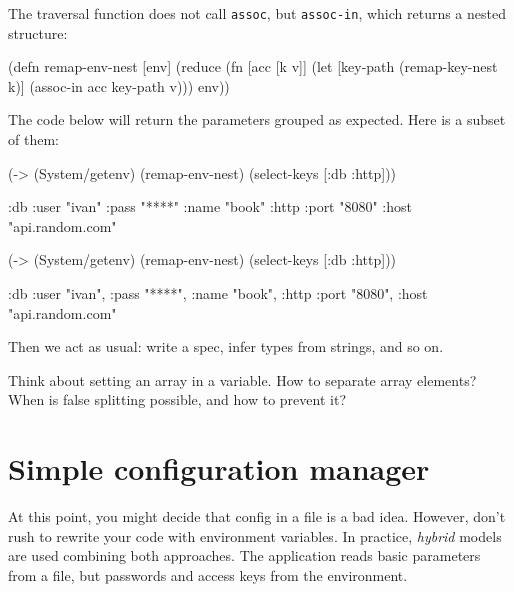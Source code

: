 
\noindent
The traversal function does not call \verb|assoc|, but \verb|assoc-in|, which returns a nested structure:

\begin{clojure}
(defn remap-env-nest
  [env]
  (reduce
   (fn [acc [k v]]
     (let [key-path (remap-key-nest k)]
       (assoc-in acc key-path v)))
   {}
   env))
\end{clojure}

The code below will return the parameters grouped as expected. Here is a subset of them:

\ifx\DEVICETYPE\MOBILE

\begin{clojure}
(-> (System/getenv)
    (remap-env-nest)
    (select-keys [:db :http]))

{:db {:user "ivan"
      :pass "****"
      :name "book"}
 :http {:port "8080"
        :host "api.random.com"}}
\end{clojure}

\else

\begin{clojure}
(-> (System/getenv)
    (remap-env-nest)
    (select-keys [:db :http]))

{:db {:user "ivan", :pass "****", :name "book"},
 :http {:port "8080", :host "api.random.com"}}
\end{clojure}

\fi

\noindent
Then we act as usual: write a spec, infer types from strings, and so on.

Think about setting an array in a variable. How to separate array elements? When is false splitting possible, and how to prevent it?

\section{Simple configuration manager}


At this point, you might decide that config in a file is a bad idea. However, don't rush to rewrite your code with environment variables. In practice, \emph{hybrid} models are used combining both approaches. The application reads basic parameters from a file, but passwords and access keys from the environment.


